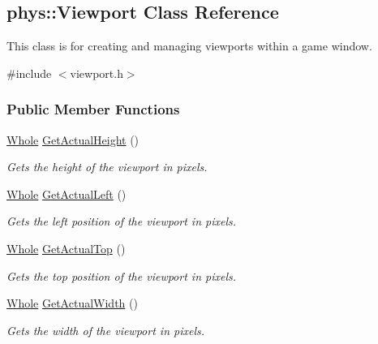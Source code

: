 \hypertarget{classphys_1_1Viewport}{
\subsection{phys::Viewport Class Reference}
\label{classphys_1_1Viewport}
}


This class is for creating and managing viewports within a game window.  




{\ttfamily \#include $<$viewport.h$>$}

\subsubsection*{Public Member Functions}
\begin{DoxyCompactItemize}
\item 
\hyperlink{namespacephys_a460f6bc24c8dd347b05e0366ae34f34a}{Whole} \hyperlink{classphys_1_1Viewport_a1eee22594548a38910dee8e838e6449d}{GetActualHeight} ()
\begin{DoxyCompactList}\small\item\em Gets the height of the viewport in pixels. \item\end{DoxyCompactList}\item 
\hyperlink{namespacephys_a460f6bc24c8dd347b05e0366ae34f34a}{Whole} \hyperlink{classphys_1_1Viewport_ad0390466fc2980e8469ddcbed66900ca}{GetActualLeft} ()
\begin{DoxyCompactList}\small\item\em Gets the left position of the viewport in pixels. \item\end{DoxyCompactList}\item 
\hyperlink{namespacephys_a460f6bc24c8dd347b05e0366ae34f34a}{Whole} \hyperlink{classphys_1_1Viewport_a1eff4fac830986548cb94123b6b31898}{GetActualTop} ()
\begin{DoxyCompactList}\small\item\em Gets the top position of the viewport in pixels. \item\end{DoxyCompactList}\item 
\hyperlink{namespacephys_a460f6bc24c8dd347b05e0366ae34f34a}{Whole} \hyperlink{classphys_1_1Viewport_a301262e5da6926296241f0e2cc2de7d2}{GetActualWidth} ()
\begin{DoxyCompactList}\small\item\em Gets the width of the viewport in pixels. \item\end{DoxyCompactList}\item 

\end{DoxyCompactItemize}
